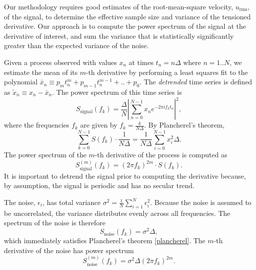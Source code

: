 \documentclass{ametsoc}
\begin{document}
Our methodology requires good estimates of the root-mean-square velocity, $u_{\textrm{rms}}$, of the signal, to determine the effective sample size and variance of the tensioned derivative. Our approach is to compute the power spectrum of the signal at the derivative of interest, and sum the variance that is statistically significantly greater than the expected variance of the noise.

Given a process observed with values $x_n$ at times $t_n = n \Delta$ where $n=1..N$, we estimate the mean of its $m$-th derivative by performing a least squares fit to the polynomial $\bar{x}_n \equiv p_m t_n^m + p_{m-1} t_n^{m-1} + .. + p_0$. The \emph{detrended} time series is defined as $\tilde{x}_n \equiv x_n - \bar{x}_n$. The power spectrum of this time series is
\begin{equation}
S_{\textrm{signal}}(f_k) = \frac{\Delta}{N} \left\lvert \sum_{n=0}^{N-1} x_n e^{-2\pi i f_k t_n} \right\rvert^2,
\end{equation}
where the frequencies $f_k$ are given by $f_k = \frac{k}{N\Delta}$. %
By Plancherel's theorem,
\begin{equation}
\label{plancherel}
\sum_{k=0}^{N-1} S(f_k) \cdot \frac{1}{N \Delta} = \frac{1}{N \Delta} \sum_{i=0}^{N-1} x_i^2 \Delta.
\end{equation}
The power spectrum of the $m$-th derivative of the process is computed as
\begin{equation}
S_{\textrm{signal}}^{(m)}(f_k) = (2 \pi f_k)^{2m} \cdot S(f_k).
\end{equation}
It is important to detrend the signal prior to computing the derivative because, by assumption, the signal is periodic and has no secular trend.

The noise, $\epsilon_i$, has total variance $\sigma^2 = \frac{1}{N} \sum_{i=1}^{N} \epsilon_i^2$. Because the noise is assumed to be uncorrelated, the variance distributes evenly across all frequencies. The spectrum of the noise is therefore
\begin{equation}
S_{\textrm{noise}}(f_k) = \sigma^2 \Delta,
\end{equation}
which immediately satisfies Plancherel's theorem \eqref{plancherel}. The $m$-th derivative of the noise has power spectrum
\begin{equation}
S_{\textrm{noise}}^{(m)}(f_k) = \sigma^2 \Delta (2 \pi f_k)^{2m}.
\end{equation}
\end{document}
